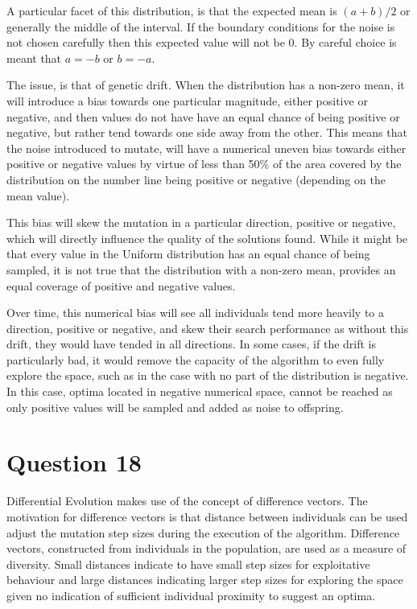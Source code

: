 \documentclass[12pt]{article}
\begin{document}
A particular facet of this distribution, is that the expected mean is $(a+b)/2$ or generally the middle of the interval. If the boundary conditions for the noise is not chosen carefully then this expected value will not be 0. By careful choice is meant that $a=-b$ or $b=-a$.

The issue, is that of genetic drift. When the distribution has a non-zero mean, it will introduce a bias towards one particular magnitude, either positive or negative, and then values do not have have an equal chance of being positive or negative, but rather tend towards one side away from the other. This means that the noise introduced to mutate, will have a numerical uneven bias towards either positive or negative values by virtue of less than 50\% of the area covered by the distribution on the number line being positive or negative (depending on the mean value). 

This bias will skew the mutation in a particular direction, positive or negative, which will directly influence the quality of the solutions found. While it might be that every value in the Uniform distribution has an equal chance of being sampled, it is not true that the distribution with a non-zero mean, provides an equal coverage of positive and negative values.

Over time, this numerical bias will see all individuals tend more heavily to a direction, positive or negative, and skew their search performance as without this drift, they would have tended in all directions. In some cases, if the drift is particularly bad, it would remove the capacity of the algorithm to even fully explore the space, such as in the case with no part of the distribution is negative. In this case, optima located in negative numerical space, cannot be reached as only positive values will be sampled and added as noise to offspring.
\section{Question 18}
Differential Evolution makes use of the concept of difference vectors. The motivation \cite{Storn1997} for difference vectors is that distance between individuals can be used adjust the mutation step sizes during the execution of the algorithm. Difference vectors, constructed from individuals in the population, are used as a measure of diversity. Small distances indicate to have small step sizes for exploitative behaviour and large distances indicating larger step sizes for exploring the space given no indication of sufficient individual proximity to suggest an optima.
\end{document}
